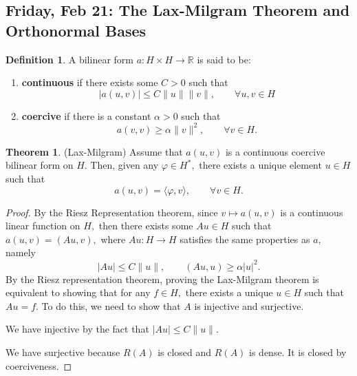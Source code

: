 \documentclass[10pt, oneside]{article}
\newcommand{\bbR}{\mathbb{R}}
\theoremstyle{definition}
\newtheorem{thm}{Theorem}
\newtheorem{defn}{Definition}
\begin{document}
\subsection{Friday, Feb 21: The Lax-Milgram Theorem and Orthonormal Bases}
\begin{defn}
    A bilinear form $a: H\times H \to \bbR$ is said to be:
    \begin{enumerate}
        \item \textbf{continuous} if there exists some $C>0$ such that 
        \[|a(u,v)| \leq C\|u\|\|v\|, \qquad \forall u, v \in H\]
        \item \textbf{coercive} if there is a constant $\alpha>0$ such  that 
        \[a(v,v) \geq \alpha\|v\|^2, \qquad \forall v\in H.\]
    \end{enumerate}
\end{defn}
\begin{thm} (Lax-Milgram)
    Assume that $a(u,v)$ is a continuous coercive bilinear form on $H.$ Then, given any $\varphi \in H^*,$ there exists a unique element $u \in H$ such that 
    \[a(u,v) = \langle\varphi, v\rangle, \qquad \forall v\in H.\]
\end{thm}
\begin{proof}
By the Riesz Representation theorem, since $v \mapsto a(u,v)$ is a continuous linear function on $H,$ then there exists some $Au \in H$ such that $a(u,v) = (Au, v),$ where $Au: H\to H$ satisfies the same properties as $a,$ namely
\[|Au| \leq C\|u\|, \qquad (Au, u) \geq \alpha|u|^2.\]
    By the Riesz representation theorem, proving the Lax-Milgram theorem is equivalent to showing that for any $f\in H,$ there exists a unique $u\in H$ such that $Au = f.$ To do this, we need to show that $A$ is injective and surjective.

    We have injective by the fact that $|Au| \leq C\|u\|.$

    We have surjective because $R(A)$ is closed and $R(A)$ is dense. It is closed by coerciveness.
\end{proof}
\end{document}
